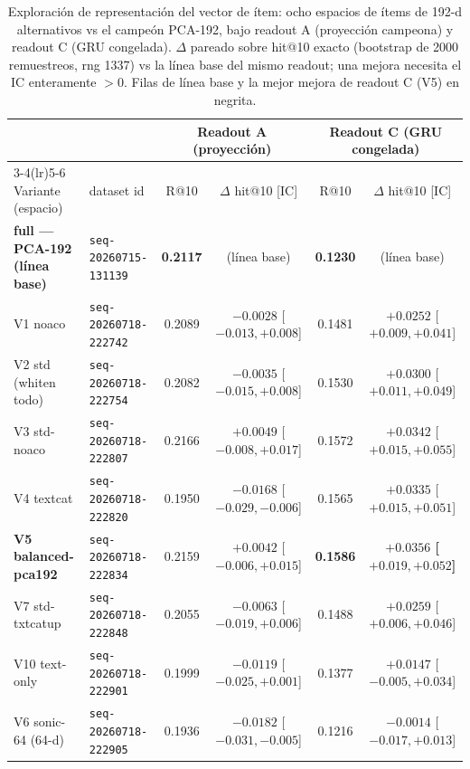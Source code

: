 \documentclass[11pt]{article}
\newcommand{\dsid}[1]{\texttt{\small #1}}
\newcommand{\best}[1]{\textbf{#1}}
\begin{document}
\begin{table}[ht]
  \centering
  \caption{Exploración de representación del vector de ítem: ocho espacios de ítems
  de 192-d alternativos vs el campeón PCA-192, bajo readout A (proyección campeona) y
  readout C (GRU congelada). $\Delta$ pareado sobre hit@10 exacto (bootstrap de 2000
  remuestreos, rng 1337) vs la línea base del mismo readout; una mejora necesita el
  IC enteramente $>0$. Filas de línea base y la mejor mejora de readout C (V5) en
  negrita.}
  \label{tab:representation}
  {\scriptsize\setlength{\tabcolsep}{3pt}\begin{tabular}{llcccc}
    \toprule
    & & \multicolumn{2}{c}{Readout A (proyección)} & \multicolumn{2}{c}{Readout C (GRU congelada)} \\
    \cmidrule(lr){3-4}\cmidrule(lr){5-6}
    Variante (espacio) & dataset id & R@10 & $\Delta$ hit@10 [IC] & R@10 & $\Delta$ hit@10 [IC] \\
    \midrule
    \best{full --- PCA-192 (línea base)} & \dsid{seq-20260715-131139} & \best{0.2117} & (línea base) & \best{0.1230} & (línea base) \\
    V1 noaco               & \dsid{seq-20260718-222742} & 0.2089 & $-0.0028$ [$-0.013,+0.008$] & 0.1481 & $+0.0252$ [$+0.009,+0.041$] \\
    V2 std (whiten todo)   & \dsid{seq-20260718-222754} & 0.2082 & $-0.0035$ [$-0.015,+0.008$] & 0.1530 & $+0.0300$ [$+0.011,+0.049$] \\
    V3 std-noaco           & \dsid{seq-20260718-222807} & 0.2166 & $+0.0049$ [$-0.008,+0.017$] & 0.1572 & $+0.0342$ [$+0.015,+0.055$] \\
    V4 textcat             & \dsid{seq-20260718-222820} & 0.1950 & $-0.0168$ [$-0.029,-0.006$] & 0.1565 & $+0.0335$ [$+0.015,+0.051$] \\
    \best{V5 balanced-pca192} & \dsid{seq-20260718-222834} & 0.2159 & $+0.0042$ [$-0.006,+0.015$] & \best{0.1586} & \best{$+0.0356$ [$+0.019,+0.052$]} \\
    V7 std-txtcatup        & \dsid{seq-20260718-222848} & 0.2055 & $-0.0063$ [$-0.019,+0.006$] & 0.1488 & $+0.0259$ [$+0.006,+0.046$] \\
    V10 text-only          & \dsid{seq-20260718-222901} & 0.1999 & $-0.0119$ [$-0.025,+0.001$] & 0.1377 & $+0.0147$ [$-0.005,+0.034$] \\
    V6 sonic-64 (64-d)     & \dsid{seq-20260718-222905} & 0.1936 & $-0.0182$ [$-0.031,-0.005$] & 0.1216 & $-0.0014$ [$-0.017,+0.013$] \\
    \bottomrule
  \end{tabular}}
\end{table}
\end{document}
